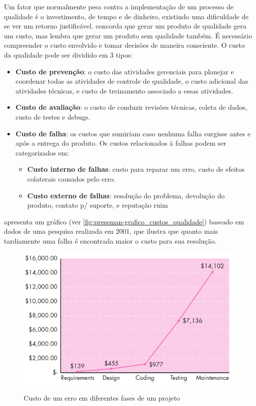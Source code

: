 \documentclass[
	12pt,				%
	openright,			%
	oneside,			%
	a4paper,			%
	english,			%
	brazil,				%
	]{abntex2}
\begin{document}
Um fator que normalmente pesa contra a implementação de um processo de qualidade é o investimento, de tempo e de dinheiro, existindo uma dificuldade de se ver um retorno justificável.  concorda que gerar um produto de qualidade gera um custo, mas lembra que gerar um produto sem qualidade também. É necessário compreender o custo envolvido e tomar decisões de maneira consciente. O custo da qualidade pode ser dividido em 3 tipos:

\begin{itemize}
    \item \textbf{Custo de prevenção}: o custo das atividades gerenciais para planejar e coordenar todas as atividades de controle de qualidade, o custo adicional das atividades técnicas, e custo de treinamento associado a essas atividades.
    \item \textbf{Custo de avaliação}: o custo de conduzir revisões técnicas, coleta de dados, custo de testes e debugs.
    \item \textbf{Custo de falha}: os custos que sumiriam caso nenhuma falha surgisse antes e após a entrega do produto. Os custos relacionados à falhas podem ser categorizados em:
    \begin{itemize}
        \item \textbf{Custo interno de falhas}: custo para reparar um erro, custo de efeitos colaterais causados pelo erro.
        \item \textbf{Custo externo de falhas}: resolução do problema, devolução do produto, contato p/ suporte, e reputação ruim
    \end{itemize}
\end{itemize}

 apresenta um gráfico (ver \autoref{fig:pressman-grafico_custos_qualidade}) baseado em dados de uma pesquisa realizada em 2001, que ilustra que quanto mais tardiamente uma falha é encontrada maior o custo para sua resolução.

\begin{figure}[h]
    \centering
    \caption{Custo de um erro em diferentes fases de um projeto}
    \graphicspath{ {./graphics/} }
    \includegraphics[scale=0.8]{pressman-grafico_custos_qualidade}
    \label{fig:pressman-grafico_custos_qualidade}
\end{figure}
\end{document}
